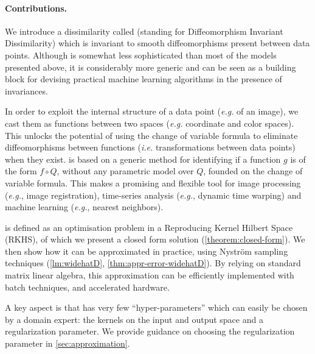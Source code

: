 \paragraph{Contributions.}
We introduce a dissimilarity called \Diffy (standing for Diffeomorphism Invariant Dissimilarity) which is invariant to smooth diffeomorphisms present between data points. Although \Diffy is somewhat less sophisticated than most of the models presented above, it is considerably more generic and can be seen as a building block for devising practical machine learning algorithms in the presence of invariances.

In order to exploit the internal structure of a data point (\emph{e.g.} of an image), we cast them as functions between two spaces (\emph{e.g.} coordinate and color spaces). This unlocks the potential of using the change of variable formula to eliminate diffeomorphisms between functions (\emph{i.e.} transformations between data points) when they exist. \Diffy is based on a generic method for identifying if a function $g$ is of the form $f\circ Q$, without any parametric model over $Q$, founded on the change of variable formula. This makes \Diffy a promising and flexible tool for image processing (\emph{e.g.}, image registration), time-series analysis (\emph{e.g.}, dynamic time warping) and machine learning (\emph{e.g.}, nearest neighbors).

\Diffy is defined as an optimisation problem in a Reproducing Kernel Hilbert Space (RKHS), of which we present a closed form solution
(\cref{theorem:closed-form}).
We then show how it can be approximated in practice, using Nyström sampling techniques (\cref{lm:widehatD}, \cref{thm:appr-error-widehatD}). By relying on standard matrix linear algebra, this approximation can be efficiently implemented with batch techniques, and accelerated hardware.

A key aspect is that \Diffy has very few ``hyper-parameters'' which can easily be chosen by a domain expert: the kernels on the input and output space and a regularization parameter. We provide guidance on choosing the regularization parameter in \cref{sec:approximation}.


